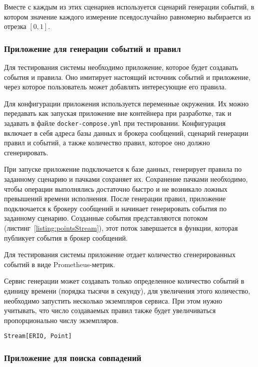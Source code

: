\documentclass[14pt]{article}
\begin{document}
Вместе с каждым из этих сценариев используется сценарий генерации событий, в котором значение каждого измерение псевдослучайно равномерно выбирается из отрезка $[0, 1]$.

\subsubsection{Приложение для генерации событий и правил}
Для тестирования системы необходимо приложение, которое будет создавать события и правила. Оно имитирует настоящий источник событий и приложение, через которое пользователь может добавлять интересующие его правила.

Для конфигурации приложения используется переменные окружения. Их можно передавать как запуская приложение вне контейнера при разработке, так и задавать в файле \verb|docker-compose.yml| при тестировании. Конфигурация включает в себя адреса базы данных и брокера сообщений, сценарий генерации правил и событий, а также количество правил, которое оно должно сгенерировать.

При запуске приложение подключается к базе данных, генерирует правила по заданному сценарию и пачками сохраняет их. Сохранение пачками необходимо, чтобы операции выполнялись достаточно быстро и не возникало ложных превышений времени исполнения. После генерации правил, приложение подключается к брокеру сообщений и начинает генерировать события по заданному сценарию. Созданные события представляются потоком (листинг~\ref{listing:pointsStream}), этот поток завершается в функции, которая публикует события в брокер сообщений.

Для тестирования системы приложение отдает количество сгенерированных событий в виде Prometheus-метрик.

Сервис генерации может создавать только определенное количество событий в единицу времени (порядка тысячи в секунду), для увеличения этого количество, необходимо запустить несколько экземпляров сервиса. При этом нужно учитывать, что число создаваемых правил также будет увеличиваться пропорционально числу экземпляров.

\begin{lstlisting}[style=scalaStyle,caption={Тип, описывающий поток событий.},label={listing:pointsStream},captionpos=b, float]
Stream[ERIO, Point]
\end{lstlisting}

\subsubsection{Приложение для поиска совпадений}
\label{section:classifier}
\end{document}
